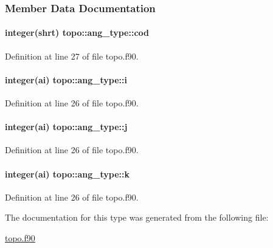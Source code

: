 \subsubsection{Member Data Documentation}
\hypertarget{structtopo_1_1ang__type_a6d871fdd94b8090045fe2b6fb69fc167}{
\paragraph[{cod}]{\setlength{\rightskip}{0pt plus 5cm}integer(shrt) topo\-::ang\-\_\-type\-::cod}}\label{structtopo_1_1ang__type_a6d871fdd94b8090045fe2b6fb69fc167}


Definition at line 27 of file topo.\-f90.

\hypertarget{structtopo_1_1ang__type_a0f3801a9d9b1b6e8cb54dbd52d86d896}{
\paragraph[{i}]{\setlength{\rightskip}{0pt plus 5cm}integer(ai) topo\-::ang\-\_\-type\-::i}}\label{structtopo_1_1ang__type_a0f3801a9d9b1b6e8cb54dbd52d86d896}


Definition at line 26 of file topo.\-f90.

\hypertarget{structtopo_1_1ang__type_ad5c5e5785930198a0e4fbbc5f7ee19c6}{
\paragraph[{j}]{\setlength{\rightskip}{0pt plus 5cm}integer(ai) topo\-::ang\-\_\-type\-::j}}\label{structtopo_1_1ang__type_ad5c5e5785930198a0e4fbbc5f7ee19c6}


Definition at line 26 of file topo.\-f90.

\hypertarget{structtopo_1_1ang__type_a92bf340692193c80422a34eb890ee17e}{
\paragraph[{k}]{\setlength{\rightskip}{0pt plus 5cm}integer(ai) topo\-::ang\-\_\-type\-::k}}\label{structtopo_1_1ang__type_a92bf340692193c80422a34eb890ee17e}


Definition at line 26 of file topo.\-f90.



The documentation for this type was generated from the following file\-:\begin{DoxyCompactItemize}
\item 
\hyperlink{topo_8f90}{topo.\-f90}\end{DoxyCompactItemize}
